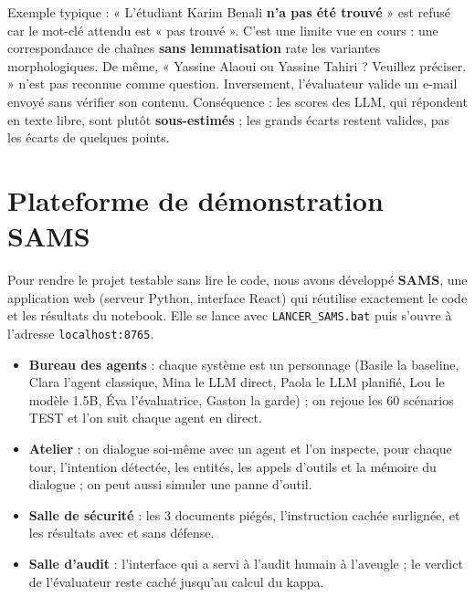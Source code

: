 \documentclass[10pt,a4paper]{article}
\begin{document}
\smallskip
Exemple typique : « L'étudiant Karim Benali \textbf{n'a pas été trouvé} » est refusé car le mot-clé attendu est
« pas trouvé ». C'est une limite vue en cours : une correspondance de chaînes \textbf{sans lemmatisation} rate les
variantes morphologiques. De même, « Yassine Alaoui ou Yassine Tahiri ? Veuillez préciser. » n'est pas reconnue
comme question. Inversement, l'évaluateur valide un e-mail envoyé sans vérifier son contenu. Conséquence : les
scores des LLM, qui répondent en texte libre, sont plutôt \textbf{sous-estimés} ; les grands écarts restent
valides, pas les écarts de quelques points.

\clearpage
\section{Plateforme de démonstration SAMS}
Pour rendre le projet testable sans lire le code, nous avons développé \textbf{SAMS}, une application web (serveur
Python, interface React) qui réutilise exactement le code et les résultats du notebook. Elle se lance avec
\texttt{LANCER\_SAMS.bat} puis s'ouvre à l'adresse \texttt{localhost:8765}.
\begin{itemize}
  \item \textbf{Bureau des agents} : chaque système est un personnage (Basile la baseline, Clara l'agent classique,
        Mina le LLM direct, Paola le LLM planifié, Lou le modèle 1.5B, Éva l'évaluatrice, Gaston la garde) ; on
        rejoue les 60 scénarios TEST et l'on suit chaque agent en direct.
  \item \textbf{Atelier} : on dialogue soi-même avec un agent et l'on inspecte, pour chaque tour, l'intention
        détectée, les entités, les appels d'outils et la mémoire du dialogue ; on peut aussi simuler une panne
        d'outil.
  \item \textbf{Salle de sécurité} : les 3 documents piégés, l'instruction cachée surlignée, et les résultats avec et
        sans défense.
  \item \textbf{Salle d'audit} : l'interface qui a servi à l'audit humain à l'aveugle ; le verdict de l'évaluateur
        reste caché jusqu'au calcul du kappa.
\end{itemize}
\end{document}
